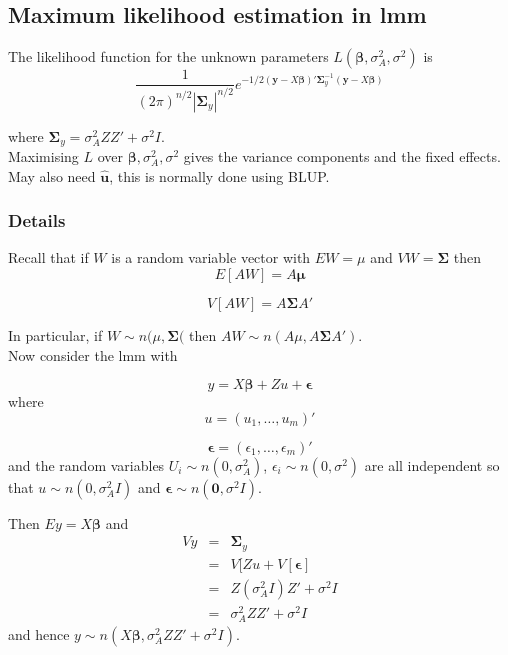 \documentclass[12pt,a4paper]{article}
\theoremstyle{regla}
\theoremstyle{remark}
\theoremstyle{definition}
\theoremstyle{nonumberbreak}
\begin{document}
\subsection{Maximum likelihood estimation in lmm}
\begin{fbox}
\begin{minipage}{0.97\textwidth}
The likelihood function for the unknown parameters $L(\boldsymbol{\beta},\sigma^2_A, \sigma^2)$ is
$$ \frac{1}{(2\pi)^{n/2} \left| \boldsymbol{\Sigma}_y \right| ^{n/2}} 
e^{-1/2 (\mathbf{y}-X\boldsymbol{\beta})' \boldsymbol{\Sigma}^{-1}_y (\mathbf{y}-X\boldsymbol{\beta})}$$

where $\boldsymbol{\Sigma}_y =  \sigma^2_A Z Z' + \sigma^2 I$.\\

Maximising $L$ over $\boldsymbol{\beta},\sigma^2_A, \sigma^2$ gives the variance components and the fixed effects. May also need $\mathbf{\hat{u}}$, this is normally done using BLUP.
\end{minipage}
\end{fbox}
\subsubsection{Details}
Recall that if $W$ is a random variable vector with $EW = \mu$ and $VW= \boldsymbol{\Sigma}$ then 
$$E[AW] = A\mathbf{\mu}$$

 
$$V[AW]= A \boldsymbol{\Sigma} A'$$

In particular, if $W \sim n(\mu, \boldsymbol{\Sigma}($ then $AW \sim n(A\mu, A \boldsymbol{\Sigma} A')$.\\

Now consider the lmm with 

$$y = X \boldsymbol{\beta} + Zu + \boldsymbol{\epsilon}$$
where
 $$u = (u_1 , \ldots , u_m)' $$

 
 $$\boldsymbol{\epsilon} = (\epsilon_1 , \ldots , \epsilon_m)'$$
and the random variables  $U_i \sim n(0, \sigma^2_A)$, $\epsilon_i \sim n(0, \sigma^2)$ are all independent so that $u \sim n(0, \sigma^2_A I)$ and $\boldsymbol{\epsilon} \sim n(\mathbf{0}, \sigma^2 I)$.

Then $Ey = X\boldsymbol{\beta}$ and 
\begin{eqnarray*}
Vy& = & \boldsymbol{\Sigma}_y \\
& = & V[Zu+V[\boldsymbol{\epsilon}] \\
& = & Z(\sigma^2_A I) Z' + \sigma^2 I\\
& = & \sigma^2_A Z Z' + \sigma^2 I
\end{eqnarray*}
and hence $y \sim n(X\boldsymbol{\beta},\sigma^2_A Z Z' + \sigma^2 I )$.\\
\end{document}
